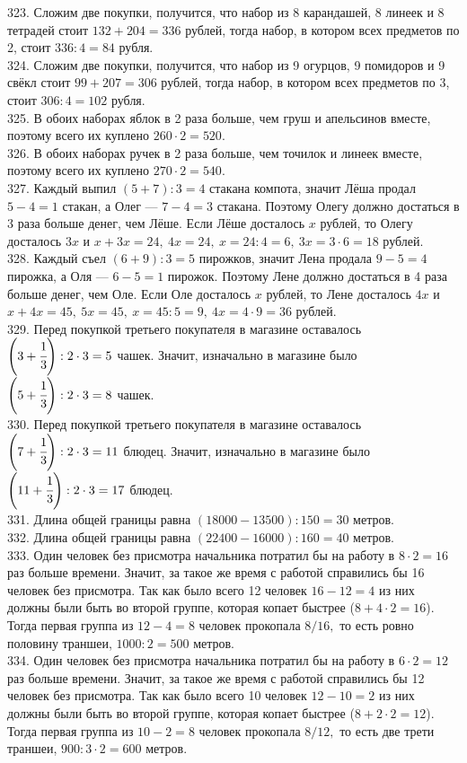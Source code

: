 \documentclass[12pt]{article}
\begin{document}
323. Сложим две покупки, получится, что набор из 8 карандашей, 8 линеек и 8 тетрадей стоит $132+204=336$ рублей, тогда набор, в котором всех предметов по 2, стоит $336:4=84$ рубля.\\
324. Сложим две покупки, получится, что набор из 9 огурцов, 9 помидоров и 9 свёкл стоит $99+207=306$ рублей, тогда набор, в котором всех предметов по 3, стоит $306:4=102$ рубля.\\
325. В обоих наборах яблок в 2 раза больше, чем груш и апельсинов вместе, поэтому всего их куплено $260\cdot2=520.$\\
326. В обоих наборах ручек в 2 раза больше, чем точилок и линеек вместе, поэтому всего их куплено $270\cdot2=540.$\\
327. Каждый выпил $(5+7):3=4$ стакана компота, значит Лёша продал $5-4=1$ стакан, а Олег --- $7-4=3$ стакана. Поэтому Олегу должно достаться в 3 раза больше денег, чем Лёше. Если Лёше досталось $x$ рублей, то Олегу досталось $3x$ и $x+3x=24,\ 4x=24,\ x=24:4=6,\ 3x=3\cdot6=18$ рублей.\\
328. Каждый съел $(6+9):3=5$ пирожков, значит Лена продала $9-5=4$ пирожка, а Оля --- $6-5=1$ пирожок. Поэтому Лене должно достаться в 4 раза больше денег, чем Оле. Если Оле досталось $x$ рублей, то Лене досталось $4x$ и $x+4x=45,\ 5x=45,\ x=45:5=9,\ 4x=4\cdot9=36$ рублей.\\
329. Перед покупкой третьего покупателя в магазине оставалось $\left(3+\cfrac{1}{3}\right):2\cdot3=5$ чашек. Значит, изначально в магазине было $\left(5+\cfrac{1}{3}\right):2\cdot3=8$ чашек.\\
330. Перед покупкой третьего покупателя в магазине оставалось $\left(7+\cfrac{1}{3}\right):2\cdot3=11$ блюдец. Значит, изначально в магазине было $\left(11+\cfrac{1}{3}\right):2\cdot3=17$ блюдец.\\
331. Длина общей границы равна $(18000-13500):150=30$ метров.\\
332. Длина общей границы равна $(22400-16000):160=40$ метров.\\
333. Один человек без присмотра начальника потратил бы на работу в $8\cdot2=16$ раз больше времени. Значит, за такое же время с работой справились бы 16 человек без присмотра. Так как было всего 12 человек $16-12=4$ из них должны были быть во второй группе, которая копает быстрее ($8+4\cdot2=16$). Тогда первая группа из $12-4=8$ человек прокопала $8/16,$ то есть ровно половину траншеи, $1000:2=500$ метров.\\
334. Один человек без присмотра начальника потратил бы на работу в $6\cdot2=12$ раз больше времени. Значит, за такое же время с работой справились бы 12 человек без присмотра. Так как было всего 10 человек $12-10=2$ из них должны были быть во второй группе, которая копает быстрее ($8+2\cdot2=12$). Тогда первая группа из $10-2=8$ человек прокопала $8/12,$ то есть две трети траншеи, $900:3\cdot2=600$ метров.\\
\end{document}
